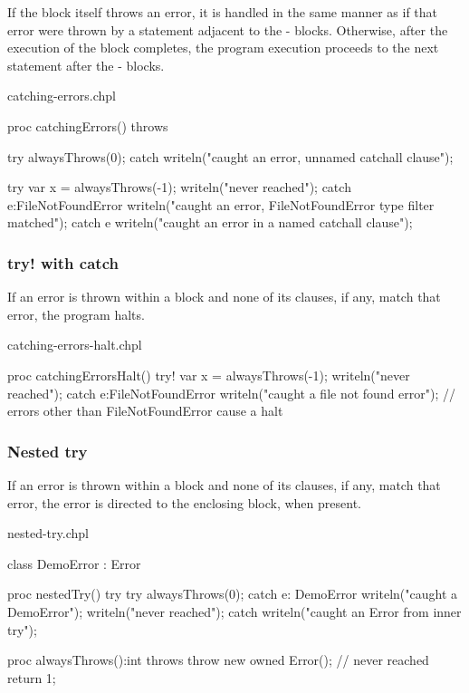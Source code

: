 If the  block itself throws an error, it is handled in the
same manner as if that error were thrown by a statement adjacent to the
- blocks. Otherwise, after the execution of the
 block completes, the program execution proceeds to the
next statement after the - blocks.

\begin{chapelexample}{catching-errors.chpl}
\begin{chapel}
proc catchingErrors() throws {
  try {
    alwaysThrows(0);
  } catch {
    writeln("caught an error, unnamed catchall clause");
  }

  try {
    var x = alwaysThrows(-1);
    writeln("never reached");
  } catch e:FileNotFoundError {
    writeln("caught an error, FileNotFoundError type filter matched");
  } catch e {
    writeln("caught an error in a named catchall clause");
  }
}
\end{chapel}
\end{chapelexample}

\subsubsection{try! with catch}
\label{try_bang_with_catch}

If an error is thrown within a  block and none of its
 clauses, if any, match that error, the program halts.

\begin{chapelexample}{catching-errors-halt.chpl}
\begin{chapel}
proc catchingErrorsHalt() {
  try! {
    var x = alwaysThrows(-1);
    writeln("never reached");
  } catch e:FileNotFoundError {
    writeln("caught a file not found error");
  }
  // errors other than FileNotFoundError cause a halt
}
\end{chapel}
\end{chapelexample}

\subsubsection{Nested try}
\label{Nested_try}

If an error is thrown within a  block and none of its
 clauses, if any, match that error, the error
is directed to the enclosing  block, when present.

\begin{chapelexample}{nested-try.chpl}
\begin{chapel}
class DemoError : Error { }

proc nestedTry() {
  try {
    try {
      alwaysThrows(0);
    } catch e: DemoError {
      writeln("caught a DemoError");
    }
    writeln("never reached");
  } catch {
    writeln("caught an Error from inner try");
  }
}
\end{chapel}
\begin{chapelpost}
proc alwaysThrows():int throws {
  throw new owned Error();
  // never reached
  return 1;
}
\end{chapelpost}
\end{chapelexample}

